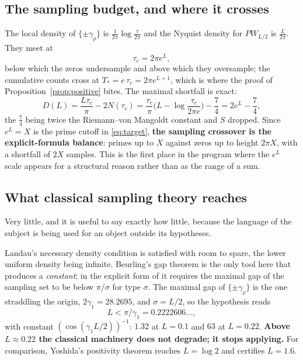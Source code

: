 \subsection{The sampling budget, and where it crosses}

The local density of $\{\pm\gamma_\rho\}$ is $\frac1{2\pi}\log\frac\tau{2\pi}$ and
the Nyquist density for $PW_{L/2}$ is $\frac L{2\pi}$. They meet at
\begin{equation}\label{eq:crossover}
 \tau_c=2\pi e^L ,
\end{equation}
below which the zeros undersample and above which they oversample; the cumulative
counts cross at $T_*=e\,\tau_c=2\pi e^{L+1}$, which is where the proof of
Proposition~\ref{prop:positive} bites. The maximal shortfall is exact:
\begin{equation}\label{eq:deficit}
 D(L)=\frac{L\tau_c}\pi-2N(\tau_c)
 =\frac{\tau_c}\pi\Big(L-\log\frac{\tau_c}{2\pi e}\Big)-\frac74
 =2e^L-\frac74 ,
\end{equation}
the $\frac74$ being twice the Riemann--von Mangoldt constant and $S$ dropped. Since
$e^L=X$ is the prime cutoff in \eqref{eq:target}, \textbf{the sampling crossover is
the explicit-formula balance}: primes up to $X$ against zeros up to height $2\pi X$,
with a shortfall of $2X$ samples. This is the first place in the program where the
$e^L$ scale appears for a structural reason rather than as the range of a sum.

\subsection{What classical sampling theory reaches}\label{subsec:reach}

Very little, and it is useful to say exactly how little, because the language of
the subject is being used for an object outside its hypotheses.

Landau's necessary density condition is satisfied with room to spare, the lower
uniform density being infinite. Beurling's gap theorem is the only tool here that
produces a \emph{constant}; in the explicit form of \cite{OlevskiiUlanovskii} it
requires the maximal gap of the sampling set to be below $\pi/\sigma$ for type
$\sigma$. The maximal gap of $\{\pm\gamma_\rho\}$ is the one straddling the origin,
$2\gamma_1=28.2695$, and $\sigma=L/2$, so the hypothesis reads
\begin{equation}\label{eq:beurling}
 L<\pi/\gamma_1=0.2222606\ldots,
\end{equation}
with constant $(\cos(\gamma_1L/2))^{-1}$: $1.32$ at $L=0.1$ and $63$ at $L=0.22$.
\textbf{Above $L\approx0.22$ the classical machinery does not degrade; it stops
applying.} For comparison, Yoshida's positivity theorem reaches $L=\log2$ and
\cite{ZhuCompact} certifies $L=1.6$.

